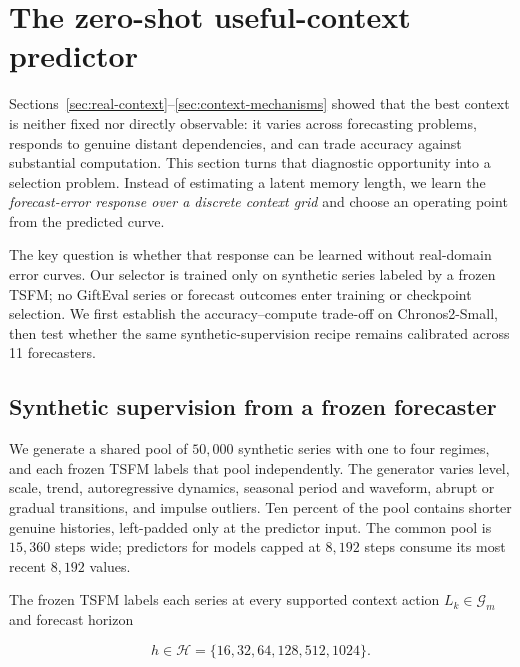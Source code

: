 
\section{The zero-shot useful-context predictor}
\label{sec:zero-shot-predictor}

Sections~\ref{sec:real-context}--\ref{sec:context-mechanisms} showed that the
best context is neither fixed nor directly observable: it varies across
forecasting problems, responds to genuine distant dependencies, and can trade
accuracy against substantial computation.  This section turns that diagnostic
opportunity into a selection problem.  Instead of estimating a latent memory
length, we learn the \emph{forecast-error response over a discrete context
grid} and choose an operating point from the predicted curve.

The key question is whether that response can be learned without real-domain
error curves.  Our selector is trained only on synthetic series labeled by a
frozen TSFM; no GiftEval series or forecast outcomes enter training or
checkpoint selection.  We first establish the accuracy--compute trade-off on
Chronos2-Small, then test whether the same synthetic-supervision recipe remains
calibrated across 11 forecasters.

\subsection{Synthetic supervision from a frozen forecaster}
\label{sec:zero-shot-labels}

We generate a shared pool of $50{,}000$ synthetic series with one to four
regimes, and each frozen TSFM labels that pool independently.  The generator
varies level, scale, trend, autoregressive dynamics, seasonal period and
waveform, abrupt or gradual transitions, and impulse outliers.  Ten percent of
the pool contains shorter genuine histories, left-padded only at the predictor
input.  The common pool is $15{,}360$ steps wide; predictors for models capped
at $8{,}192$ steps consume its most recent $8{,}192$ values.

The frozen TSFM labels each series at every supported context action
$L_k\in\mathcal{G}_m$ and forecast horizon

\begin{equation}
    h\in\mathcal{H}
      = \{16,32,64,128,512,1024\}.
    \label{eq:predictor-horizon-grid}
\end{equation}

